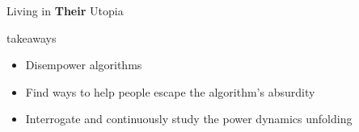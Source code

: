 \documentclass[presentation]{subfiles}
\begin{document}
\begin{frame}{Living in {\bfseries Their} Utopia}
  
\end{frame}



\begin{frame}{takeaways}
  \begin{itemize}
    \item Disempower algorithms
    \item Find ways to help people escape the algorithm's absurdity
    \item Interrogate and continuously study the power dynamics unfolding
  \end{itemize}


\end{frame}
\end{document}
